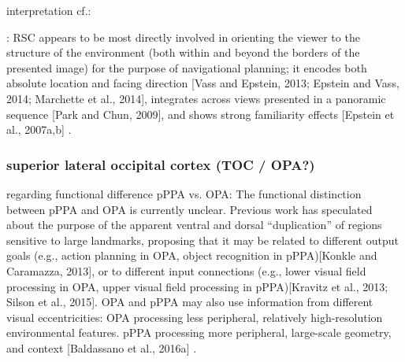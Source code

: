 \documentclass[english]{article}
\begin{document}
interpretation cf.: \citep{vann2009what, chrastil2018heterogeneity,
silson2019posterior}


\citep{baldassano2016two}: RSC appears to be most directly
involved in orienting the viewer to the structure of the environment (both
within and beyond the borders of the presented image) for the purpose of
navigational planning; it encodes both absolute location and facing direction
[Vass and Epstein, 2013; Epstein and Vass, 2014; Marchette et al., 2014],
integrates across views presented in a panoramic sequence [Park and Chun, 2009],
and shows strong familiarity effects [Epstein et al., 2007a,b]
\citep{baldassano2016two}.


\subsubsection{superior lateral occipital cortex (TOC / OPA?)}




%
\citep{baldassano2016two} regarding functional difference pPPA vs. OPA: The
functional distinction between pPPA and OPA is currently unclear. Previous work
has speculated about the purpose of the apparent ventral and dorsal
``duplication'' of regions sensitive to large landmarks, proposing that it may
be related to different output goals (e.g., action planning in OPA, object
recognition in pPPA)[Konkle and Caramazza, 2013], or to different input
connections (e.g., lower visual field processing in OPA, upper visual field
processing in pPPA)[Kravitz et al., 2013; Silson et al., 2015]. OPA and pPPA may
also use information from different visual eccentricities: OPA processing less
peripheral, relatively high-resolution environmental features. pPPA processing
more peripheral, large-scale geometry, and context [Baldassano et al., 2016a]
\citep{baldassano2016two}.
\end{document}

